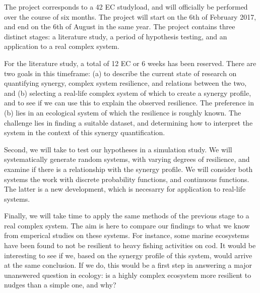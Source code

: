 \documentclass[11pt]{article}
\begin{document}
The project corresponds to a 42 EC studyload, and will officially be performed over the course of six months. 
The project will start on the 6th of February 2017, and end on the 6th of August in the same year.
The project contains three distinct stages: a literature study, a period of hypothesis testing, and an application to a real complex system. 

For the literature study, a total of 12 EC or 6 weeks has been reserved. 
There are two goals in this timeframe: (a) to describe the current state of research on quantifying synergy, complex system resilience, and relations between the two, and (b) selecting a real-life complex system of which to create a synergy profile, and to see if we can use this to explain the observed resilience. 
The preference in (b) lies in an ecological system of which the resilience is roughly known. 
The challenge lies in finding a suitable dataset, and determining how to interpret the system in the context of this synergy quantification.

Second, we will take to test our hypotheses in a simulation study. 
We will systematically generate random systems, with varying degrees of resilience, and examine if there is a relationship with the synergy profile. 
We will consider both systems the work with discrete probability functions, and continuous functions. 
The latter is a new development, which is necesarry for application to real-life systems.

Finally, we will take time to apply the same methods of the previous stage to a real complex system. 
The aim is here to compare our findings to what we know from emperical studies on these systems. 
For instance, some marine ecosystems have been found to not be resilient to heavy fishing activities on cod.
It would be interesting to see if we, based on the synergy profile of this system, would arrive at the same conclusion.
If we do, this would be a first step in answering a major unanswered question in ecology: is a highly complex ecosystem more resilient to nudges than a simple one, and why?
\end{document}
